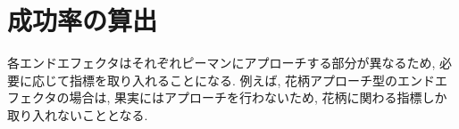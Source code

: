 \section{成功率の算出}
各エンドエフェクタはそれぞれピーマンにアプローチする部分が異なるため, 必要に応じて指標を取り入れることになる.
例えば, 花柄アプローチ型のエンドエフェクタの場合は, 果実にはアプローチを行わないため, 花柄に関わる指標しか取り入れないこととなる.
